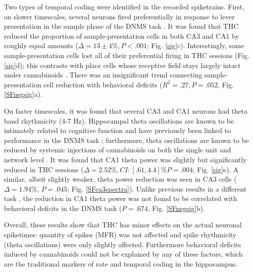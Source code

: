 \documentclass[11pt,a4paper,final]{article}
\begin{document}
Two types of temporal coding were identified in the recorded spiketrains.
First, on slower timescales, several neurons fired preferentially in response to lever presentation in the sample phase of the DNMS task \citep{hampson99}.
It was found that THC reduced the proportion of sample-presentation cells in both CA3 and CA1 by roughly equal amounts ($\Delta=13\pm4\%, P<.001$; Fig. \ref{sig}c).
Interestingly, some sample-presentation cells lost all of their preferential firing in THC sessions (Fig.\ref{sig}d); this contrasts with place cells whose receptive field stays largely intact under cannabinoids \citep{robbe09}.
There was an insignificant trend connecting sample-presentation cell reduction with behavioral deficits ($R^2=.27, P=.052$, Fig. \ref{SFnegsig}a).

On faster timescales, it was found that several CA3 and CA1 neurons had theta band rhythmicity (4-7 Hz).
Hippocampal theta oscillations are known to be intimately related to cognitive function \citep{buzsaki06,colgin13,moser13} and have previously been linked to performance in the DNMS task \citep{hasselmo10};
furthermore, theta oscillations are known to be reduced by systemic injections of cannabinoids on both the single unit \citep{robbe06} and network level \citep{kocsis08}.
It was found that CA1 theta power was slightly but significantly reduced in THC sessions ($\Delta=2.52\%, CI:[.61,4.4]\% P=.004$; Fig. \ref{sig}e).
A similar, albeit slightly weaker, theta power reduction was seen in CA3 cells ($\Delta=1.94\%$, $P=.045$; Fig. \ref{SFca3spectra}).
Unlike previous results in a different task \citep{robbe06}, the reduction in CA1 theta power was not found to be correlated with behavioral deficits in the DNMS task ($P=.674$, Fig. \ref{SFnegsig}b).

Overall, these results show that THC has minor effects on the actual neuronal spiketimes: quantity of spikes (MFR) was not affected and spike rhythmicity (theta oscillations) were only slightly affected.
Furthermore behavioral deficits induced by cannabinoids could not be explained by any of these factors, which are the traditional markers of rate and temporal coding in the hippocampus.
\end{document}
